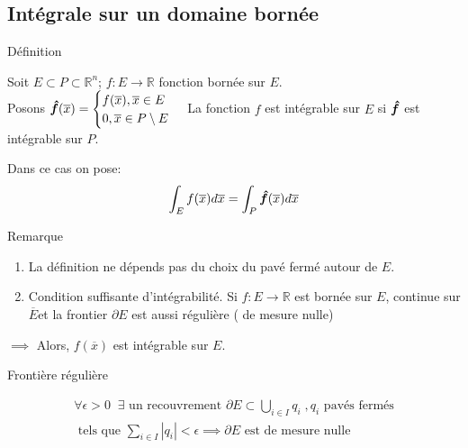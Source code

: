 \subsection{Intégrale sur un domaine bornée}
\begin{parag}{Définition}
    \begin{definition}
        Soit $E \subset P \subset \mathbb{R}^{n}$; $f: E \to \mathbb{R}$ fonction bornée sur $E$.\\
        Posons $\bhat{f}\left(\overline{x}\right) =  \begin{cases} f\left(\overline{x}\right), \overline{x} \in E\\ 0, \overline{x} \in P \setminus E \end{cases}$ La fonction $f$ est intégrable sur $E$ si $\bm{\hat{f}}$ est intégrable sur $P$.
    \end{definition}
    Dans ce cas on pose: 
    \begin{align*} \int_E f\left(\overline{x}\right) d\overline{x} =  \int_P \bhat{f}\left(\overline{x}\right) d\overline{x} \end{align*}
\end{parag}
\begin{parag}{Remarque}
    \begin{enumerate}
        \item La définition ne dépends pas du choix du pavé fermé autour de $E$.
        \item Condition suffisante d'intégrabilité. Si $f : E \to \mathbb{R}$ est bornée sur $E$, continue sur $\overline{E}$et la frontier $\partial E$ est aussi régulière ( de mesure nulle)
    \end{enumerate}
    $\implies $ Alors, $f\left(\overline{x}\right)$ est intégrable sur $E$.
    \begin{subparag}{Frontière régulière}
         \begin{definition}
            \begin{align*} 
                \forall \epsilon > 0\; \; \exists \text{ un recouvrement } \partial E \subset \bigcup_{i \in I}q_i\; , q_i \text{ pavés fermés} \\\text{ tels que } \sum_{i \in I}\left|q_i\right| < \epsilon
                \implies \partial E \text{ est de mesure nulle }
            \end{align*}
         \end{definition}
         \begin{align*}
            
         \end{align*}
    \end{subparag}
    
\end{parag}


